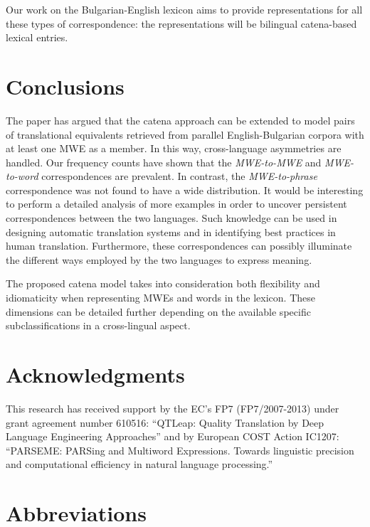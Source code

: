 \documentclass[output=paper]{langsci/langscibook}
\begin{document}

Our work on the Bulgarian-English lexicon aims to provide representations for all these types of correspondence: the representations will be bilingual catena-based lexical entries.


\section{Conclusions}
\label{Sec:Conclusions}

The paper has argued that the catena approach can be extended to model pairs
of translational equivalents retrieved from parallel English-Bulgarian
corpora with at least one MWE as a member. In this way,
cross-language asymmetries are handled.
Our frequency counts have shown that the {\em MWE-to-MWE} and {\em
MWE-to-word} correspondences are prevalent. In contrast, the {\em
MWE-to-phrase} correspondence was not found to have a wide distribution. It
would be interesting to perform a detailed analysis of more examples in
order to uncover persistent correspondences between the two languages. Such
knowledge can be used in designing automatic translation systems and in
identifying best practices in human translation. Furthermore, these
correspondences can possibly illuminate the different ways employed by the
two languages to express meaning.

The proposed catena model takes into consideration both flexibility and
idiomaticity when representing MWEs and words in the lexicon. These
dimensions can be detailed further depending on the available specific
subclassifications in a cross-lingual aspect.


\section*{Acknowledgments}

This research has received support by the EC's FP7 (FP7/2007-2013) under
grant agreement number 610516: ``QTLeap: Quality Translation by Deep
Language Engineering Approaches'' and by European COST Action IC1207:
``PARSEME: PARSing and Multiword Expressions. Towards linguistic precision
and computational efficiency in natural language processing.''



\section*{Abbreviations}
 
\end{document}
